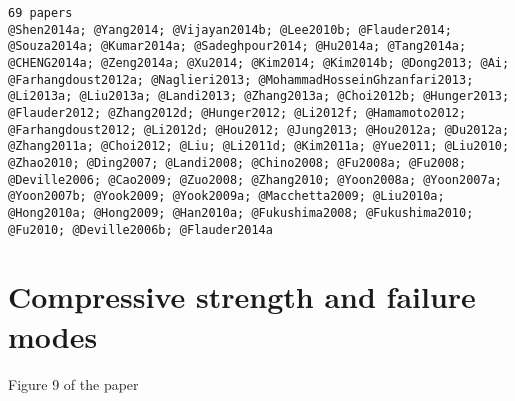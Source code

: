 \documentclass[11pt]{article}
\begin{document}
    \begin{Verbatim}[commandchars=\\\{\}]
69 papers
@Shen2014a; @Yang2014; @Vijayan2014b; @Lee2010b; @Flauder2014; @Souza2014a; @Kumar2014a; @Sadeghpour2014; @Hu2014a; @Tang2014a; @CHENG2014a; @Zeng2014a; @Xu2014; @Kim2014; @Kim2014b; @Dong2013; @Ai; @Farhangdoust2012a; @Naglieri2013; @MohammadHosseinGhzanfari2013; @Li2013a; @Liu2013a; @Landi2013; @Zhang2013a; @Choi2012b; @Hunger2013; @Flauder2012; @Zhang2012d; @Hunger2012; @Li2012f; @Hamamoto2012; @Farhangdoust2012; @Li2012d; @Hou2012; @Jung2013; @Hou2012a; @Du2012a; @Zhang2011a; @Choi2012; @Liu; @Li2011d; @Kim2011a; @Yue2011; @Liu2010; @Zhao2010; @Ding2007; @Landi2008; @Chino2008; @Fu2008a; @Fu2008; @Deville2006; @Cao2009; @Zuo2008; @Zhang2010; @Yoon2008a; @Yoon2007a; @Yoon2007b; @Yook2009; @Yook2009a; @Macchetta2009; @Liu2010a; @Hong2010a; @Hong2009; @Han2010a; @Fukushima2008; @Fukushima2010; @Fu2010; @Deville2006b; @Flauder2014a

    \end{Verbatim}

    \hypertarget{compressive-strength-and-failure-modes}{%
\section{Compressive strength and failure
modes}\label{compressive-strength-and-failure-modes}}

Figure 9 of the paper
\end{document}
